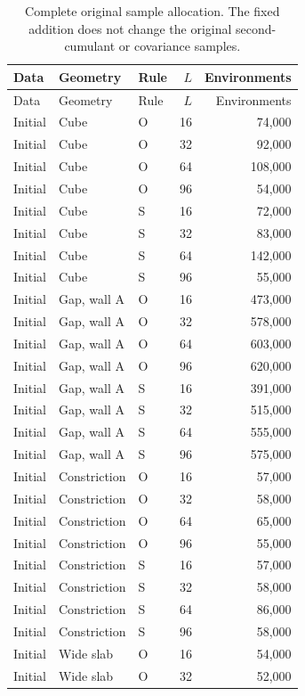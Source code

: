 {\small\setlength{\tabcolsep}{3.5pt}
\begin{longtable}{lllrr}
\caption{Complete original sample allocation. The fixed addition does not change the original second-cumulant or covariance samples.}\\
\toprule
Data & Geometry & Rule & $L$ & Environments\\
\midrule
\endfirsthead
\toprule
Data & Geometry & Rule & $L$ & Environments\\
\midrule
\endhead
\bottomrule\endfoot
Initial & Cube & O & 16 & 74,000\\
Initial & Cube & O & 32 & 92,000\\
Initial & Cube & O & 64 & 108,000\\
Initial & Cube & O & 96 & 54,000\\
Initial & Cube & S & 16 & 72,000\\
Initial & Cube & S & 32 & 83,000\\
Initial & Cube & S & 64 & 142,000\\
Initial & Cube & S & 96 & 55,000\\
Initial & Gap, wall A & O & 16 & 473,000\\
Initial & Gap, wall A & O & 32 & 578,000\\
Initial & Gap, wall A & O & 64 & 603,000\\
Initial & Gap, wall A & O & 96 & 620,000\\
Initial & Gap, wall A & S & 16 & 391,000\\
Initial & Gap, wall A & S & 32 & 515,000\\
Initial & Gap, wall A & S & 64 & 555,000\\
Initial & Gap, wall A & S & 96 & 575,000\\
Initial & Constriction & O & 16 & 57,000\\
Initial & Constriction & O & 32 & 58,000\\
Initial & Constriction & O & 64 & 65,000\\
Initial & Constriction & O & 96 & 55,000\\
Initial & Constriction & S & 16 & 57,000\\
Initial & Constriction & S & 32 & 58,000\\
Initial & Constriction & S & 64 & 86,000\\
Initial & Constriction & S & 96 & 58,000\\
Initial & Wide slab & O & 16 & 54,000\\
Initial & Wide slab & O & 32 & 52,000\\

\end{longtable}}
